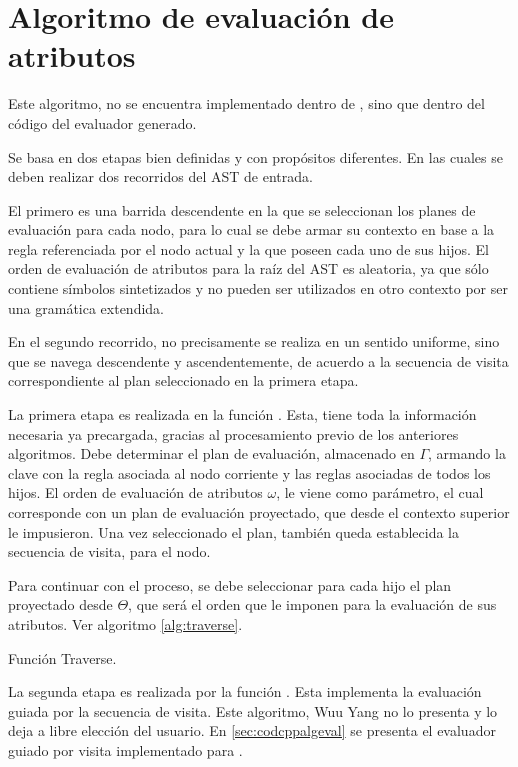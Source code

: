 \section{Algoritmo de evaluación de atributos}
\label{sec:algevalattr}

Este algoritmo, no se encuentra implementado dentro de \maggen, sino que dentro del código del evaluador generado.

Se basa en dos etapas bien definidas y con propósitos diferentes. En las cuales se deben realizar dos recorridos del AST de entrada.

El primero es una barrida descendente en la que se seleccionan los planes de evaluación para cada nodo, para lo cual se debe armar su contexto en base a la regla referenciada por el nodo actual y la que poseen cada uno de sus hijos. El orden de evaluación de atributos para la raíz del AST es aleatoria, ya que sólo contiene símbolos sintetizados y no pueden ser utilizados en otro contexto por ser una gramática extendida.

En el segundo recorrido, no precisamente se realiza en un sentido uniforme, sino que se navega descendente y ascendentemente, de acuerdo a la secuencia de visita correspondiente al plan seleccionado en la primera etapa. 

La primera etapa es realizada en la función . Esta, tiene toda la información necesaria ya precargada, gracias al procesamiento previo de los anteriores algoritmos. Debe determinar el plan de evaluación, almacenado en $\Gamma$, armando la clave con la regla asociada al nodo corriente y las reglas asociadas de todos los hijos. El orden de evaluación de atributos $\omega$, le viene como parámetro, el cual corresponde con un plan de evaluación proyectado, que desde el contexto superior le impusieron. Una vez seleccionado el plan, también queda establecida la secuencia de visita, para el nodo.

Para continuar con el proceso, se debe seleccionar para cada hijo el plan proyectado desde $\Theta$, que será el orden que le imponen para la evaluación de sus atributos. Ver algoritmo \ref{alg:traverse}.

\begin{algorithm}[!ht]

\vspace{-0.5cm}
\caption{\label{alg:traverse}Función Traverse.}
\end{algorithm}

La segunda etapa es realizada por la función . Esta implementa la evaluación guiada por la secuencia de visita. Este algoritmo, Wuu Yang no lo presenta y lo deja a libre elección del usuario. En \ref{sec:codcppalgeval} se presenta el evaluador guiado por visita implementado para \maggen. 


